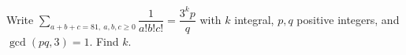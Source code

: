 Write $\sum_{a+b+c=81,\ a,b,c\ge0}\dfrac{1}{a!b!c!}=\dfrac{3^kp}{q}$ with $k$ integral, $p,q$ positive integers, and $\gcd(pq,3)=1$. Find $k$.
